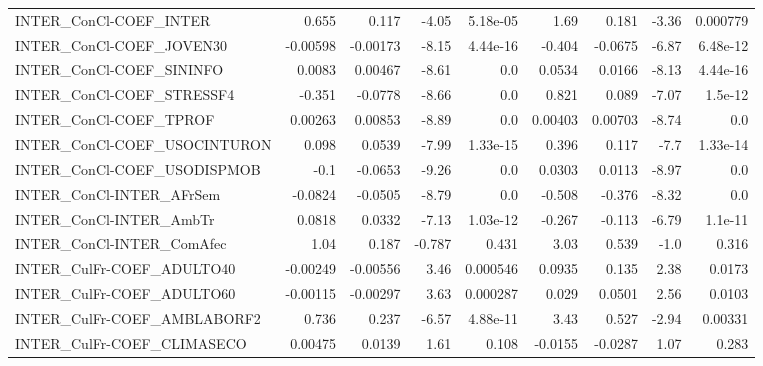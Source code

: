 \begin{tabular}{lrrrrrrrr}
INTER\_ConCl-COEF\_INTER                &       0.655 &        0.117 &    -4.05 & 5.18e-05 &       1.69 &       0.181 &        -3.36 &      0.000779 \\
INTER\_ConCl-COEF\_JOVEN30              &    -0.00598 &     -0.00173 &    -8.15 & 4.44e-16 &     -0.404 &     -0.0675 &        -6.87 &      6.48e-12 \\
INTER\_ConCl-COEF\_SININFO              &      0.0083 &      0.00467 &    -8.61 &      0.0 &     0.0534 &      0.0166 &        -8.13 &      4.44e-16 \\
INTER\_ConCl-COEF\_STRESSF4             &      -0.351 &      -0.0778 &    -8.66 &      0.0 &      0.821 &       0.089 &        -7.07 &       1.5e-12 \\
INTER\_ConCl-COEF\_TPROF                &     0.00263 &      0.00853 &    -8.89 &      0.0 &    0.00403 &     0.00703 &        -8.74 &           0.0 \\
INTER\_ConCl-COEF\_USOCINTURON          &       0.098 &       0.0539 &    -7.99 & 1.33e-15 &      0.396 &       0.117 &         -7.7 &      1.33e-14 \\
INTER\_ConCl-COEF\_USODISPMOB           &        -0.1 &      -0.0653 &    -9.26 &      0.0 &     0.0303 &      0.0113 &        -8.97 &           0.0 \\
INTER\_ConCl-INTER\_AFrSem              &     -0.0824 &      -0.0505 &    -8.79 &      0.0 &     -0.508 &      -0.376 &        -8.32 &           0.0 \\
INTER\_ConCl-INTER\_AmbTr               &      0.0818 &       0.0332 &    -7.13 & 1.03e-12 &     -0.267 &      -0.113 &        -6.79 &       1.1e-11 \\
INTER\_ConCl-INTER\_ComAfec             &        1.04 &        0.187 &   -0.787 &    0.431 &       3.03 &       0.539 &         -1.0 &         0.316 \\
INTER\_CulFr-COEF\_ADULTO40             &    -0.00249 &     -0.00556 &     3.46 & 0.000546 &     0.0935 &       0.135 &         2.38 &        0.0173 \\
INTER\_CulFr-COEF\_ADULTO60             &    -0.00115 &     -0.00297 &     3.63 & 0.000287 &      0.029 &      0.0501 &         2.56 &        0.0103 \\
INTER\_CulFr-COEF\_AMBLABORF2           &       0.736 &        0.237 &    -6.57 & 4.88e-11 &       3.43 &       0.527 &        -2.94 &       0.00331 \\
INTER\_CulFr-COEF\_CLIMASECO            &     0.00475 &       0.0139 &     1.61 &    0.108 &    -0.0155 &     -0.0287 &         1.07 &         0.283 \\

\end{tabular}
